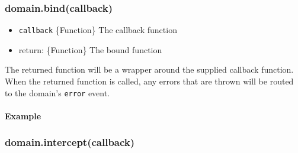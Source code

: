 \subsubsection{domain.bind(callback)}\label{domain.bindcallback}

\begin{itemize}
\itemsep1pt\parskip0pt
\item
  \texttt{callback} \{Function\} The callback function
\item
  return: \{Function\} The bound function
\end{itemize}

The returned function will be a wrapper around the supplied callback
function. When the returned function is called, any errors that are
thrown will be routed to the domain's \texttt{error} event.

\paragraph{Example}\label{example}

\begin{Shaded}
\begin{Highlighting}[]
 \NormalTok{();}

 
  \NormalTok{, }\NormalTok{(}
     \NormalTok{);}
  \NormalTok{\}));}
\NormalTok{\}}

\NormalTok{(}\NormalTok{, }
\NormalTok{\});}
\end{Highlighting}
\end{Shaded}

\subsubsection{domain.intercept(callback)}\label{domain.interceptcallback}

